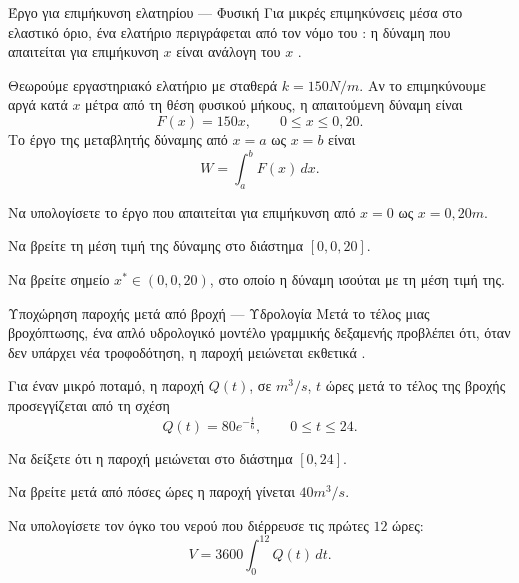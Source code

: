 \begin{problhma}{Έργο για επιμήκυνση ελατηρίου --- Φυσική}
Για μικρές επιμηκύνσεις μέσα στο ελαστικό όριο, ένα ελατήριο
περιγράφεται από τον νόμο του : η δύναμη που απαιτείται για
επιμήκυνση \(x\) είναι ανάλογη του \(x\) \cite{hookesLawSpring}.

Θεωρούμε εργαστηριακό ελατήριο με σταθερά
\(k=150\si{N/m}\). Αν το επιμηκύνουμε αργά κατά \(x\) μέτρα από τη
θέση φυσικού μήκους, η απαιτούμενη δύναμη είναι
\[
  F(x)=150x,\qquad 0\leq x\leq0{,}20.
\]
Το έργο της μεταβλητής δύναμης από \(x=a\) ως \(x=b\) είναι
\[
  W=\int_a^b F(x)\,dx.
\]
\begin{alist}
  \item Να υπολογίσετε το έργο που απαιτείται για επιμήκυνση από
        \(x=0\) ως \(x=0{,}20\si{m}\).
  \item Να βρείτε τη μέση τιμή της δύναμης στο διάστημα
        \([0,0{,}20]\).
  \item Να βρείτε σημείο \(x^*\in(0,0{,}20)\), στο οποίο η δύναμη
        ισούται με τη μέση τιμή της.
\end{alist}
\end{problhma}

\begin{problhma}{Υποχώρηση παροχής μετά από βροχή --- Υδρολογία}
Μετά το τέλος μιας βροχόπτωσης, ένα απλό υδρολογικό μοντέλο γραμμικής
δεξαμενής προβλέπει ότι, όταν δεν υπάρχει νέα τροφοδότηση, η παροχή
μειώνεται εκθετικά \cite{linearReservoirRunoffModel}.

Για έναν μικρό ποταμό, η παροχή \(Q(t)\), σε \(\si{m^3/s}\), \(t\)
ώρες μετά το τέλος της βροχής προσεγγίζεται από τη σχέση
\[
  Q(t)=80e^{-\frac{t}{6}},\qquad 0\leq t\leq24.
\]
\begin{alist}
  \item Να δείξετε ότι η παροχή μειώνεται στο διάστημα \([0,24]\).
  \item Να βρείτε μετά από πόσες ώρες η παροχή γίνεται
        \(40\si{m^3/s}\).
  \item Να υπολογίσετε τον όγκο του νερού που διέρρευσε τις πρώτες
        \(12\) ώρες:
        \[
          V=3600\int_0^{12} Q(t)\,dt.
        \]
\end{alist}
\end{problhma}

